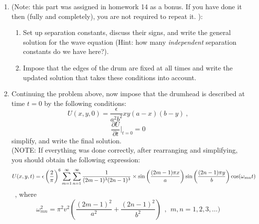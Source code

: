 \documentclass[fleqn]{article}
\begin{document}
  \begin{enumerate}
  \item  (Note: this part was assigned in homework 14 as a bonus. If you have done it then (fully and completely), you are not required to repeat it. ): 

    \begin{enumerate}
    \item Set up separation constants, discuss their signs, and write the general solution for the wave equation (Hint: how many \emph{independent} separation constants do we have here?).

    \item Impose that the edges of the drum are fixed at all times and write the updated solution that takes these conditions into account.  
    \end{enumerate}


  \item  Continuing the problem above, now impose that the drumhead is described at time $t=0$ by the following conditions: 
      $$
      U(x, y, 0) = \frac{\epsilon}{a^2 b^2} xy(a-x)(b-y)~, 
      $$
      $$
      \frac{\partial U}{\partial t} \bigg|_{t=0}=0
      $$
      simplify, and write the final solution. \\

      (NOTE:  If everything was done correctly, after rearranging and simplifying, you should obtain the following expression: 
      $$
      U(x,y,t)= \epsilon \left(\frac{2}{\pi} \right)^6 \sum^{\infty}_{m=1} \sum^{\infty}_{n=1} \frac{1}{(2m-1)^3( 2n -1)^3} \\
      \times \sin\left( \frac{(2m-1) \pi x}{a} \right) \sin \left( \frac{(2n-1) \pi y}{b}  \right)  \cos(\omega_{mn} t)
      $$~, where
      $$
      \omega^2_{mn}= \pi^2 v^2 \left(  \frac{(2m-1)^2 }{a^2} +  \frac{(2n-1)^2}{ b^2}    \right)~~,~~m,n=1,2,3,...  ) 
      $$

  \end{enumerate}
\end{document}
